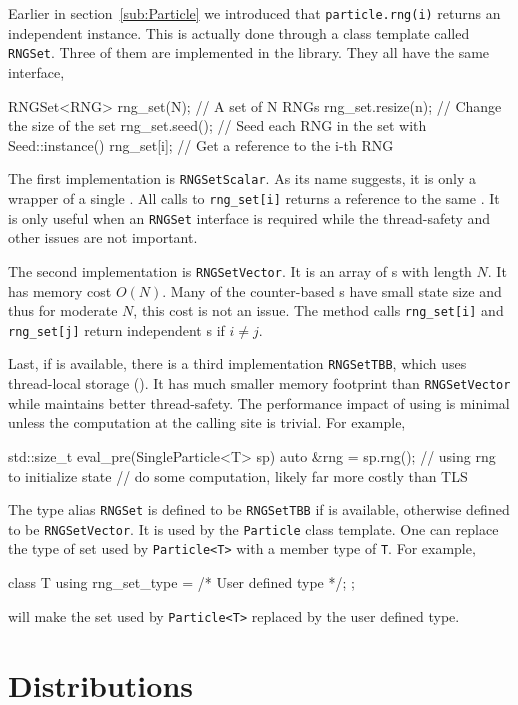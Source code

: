 Earlier in section~\ref{sub:Particle} we introduced that \verb|particle.rng(i)|
returns an independent \rng instance. This is actually done through a class
template called \verb|RNGSet|. Three of them are implemented in the library.
They all have the same interface,
\begin{cppcode}
  RNGSet<RNG> rng_set(N); // A set of N RNGs
  rng_set.resize(n);      // Change the size of the set
  rng_set.seed();         // Seed each RNG in the set with Seed::instance()
  rng_set[i];             // Get a reference to the i-th RNG
\end{cppcode}
The first implementation is \verb|RNGSetScalar|. As its name suggests, it is
only a wrapper of a single \rng. All calls to \verb|rng_set[i]| returns a
reference to the same \rng. It is only useful when an \verb|RNGSet| interface
is required while the thread-safety and other issues are not important.

The second implementation is \verb|RNGSetVector|. It is an array of \rng{}s
with length $N$. It has memory cost $O(N)$. Many of the counter-based \rng{}s
have small state size and thus for moderate $N$, this cost is not an issue. The
method calls \verb|rng_set[i]| and \verb|rng_set[j]| return independent \rng{}s
if $i \ne j$.

Last, if \tbb is available, there is a third implementation \verb|RNGSetTBB|,
which uses thread-local storage (\tls). It has much smaller memory footprint
than \verb|RNGSetVector| while maintains better thread-safety. The performance
impact of using \tls is minimal unless the computation at the calling site is
trivial. For example,
\begin{cppcode}
  std::size_t eval_pre(SingleParticle<T> sp)
  {
      auto &rng = sp.rng();
      // using rng to initialize state
      // do some computation, likely far more costly than TLS
  }
\end{cppcode}
The type alias \verb|RNGSet| is defined to be \verb|RNGSetTBB| if \tbb is
available, otherwise defined to be \verb|RNGSetVector|. It is used by the
\verb|Particle| class template. One can replace the type of \rng set used by
\verb|Particle<T>| with a member type of \verb|T|. For example,
\begin{cppcode}
  class T
  {
      using rng_set_type = /* User defined type */;
  };
\end{cppcode}
will make the \rng set used by \verb|Particle<T>| replaced by the user defined
type.

\section{Distributions}
\label{sec:Distributions}

